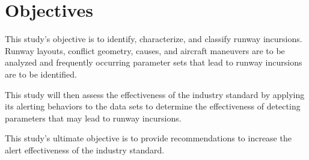 \section{Objectives}

This study's objective is to identify, characterize, and classify runway incursions. Runway layouts, conflict geometry, causes, and aircraft maneuvers are to be analyzed and frequently occurring parameter sets that lead to runway incursions are to be identified.

This study will then assess the effectiveness of the industry standard by applying its alerting behaviors to the data sets to determine the effectiveness of detecting parameters that may lead to runway incursions.

This study's ultimate objective is to provide recommendations to increase the alert effectiveness of the industry standard.

\newpage
